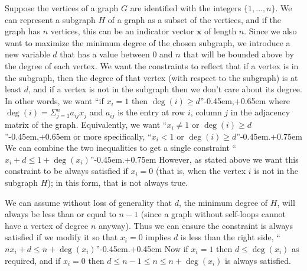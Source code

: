 Suppose the vertices of a graph $G$ are identified with the integers $\{1, \dotsc, n\}$.
We can represent a subgraph $H$ of a graph as a subset of the vertices, and if the graph has $n$ vertices, this can be an indicator vector $\mathbf{x}$ of length $n$.
Since we also want to maximize the minimum degree of the chosen subgraph, we introduce a new variable $d$ that has a value between $0$ and $n$ that will be bounded above by the degree of each vertex.
We want the constraints to reflect that if a vertex is in the subgraph, then the degree of that vertex (with respect to the subgraph) is at least $d$, and if a vertex is not in the subgraph then we don't care about its degree.
In other words, we want ``if $x_i = 1$ then $\deg(i) \geq d$''\kern-0.45em,\kern+0.65em where $\deg(i) = \Sigma_{j = 1}^n a_{ij} x_j$ and $a_{ij}$ is the entry at row $i$, column $j$ in the adjacency matrix of the graph.
Equivalently, we want ``$x_i \neq 1$ or $\deg(i) \geq d$''\kern-0.45em,\kern+0.65em or more specifically, ``$x_i < 1$ or $\deg(i) \geq d$''\kern-0.45em.\kern+0.75em
We can combine the two inequalities to get a single constraint ``$x_i + d \leq 1 + \deg(x_i)$''\kern-0.45em.\kern+0.75em
However, as stated above we want this constraint to be always satisfied if $x_i = 0$ (that is, when the vertex $i$ is not in the subgraph $H$); in this form, that is not always true.

We can assume without loss of generality that $d$, the minimum degree of $H$, will always be less than or equal to $n - 1$ (since a graph without self-loops cannot have a vertex of degree $n$ anyway).
Thus we can ensure the constraint is always satisfied if we modify it so that $x_i = 0$ implies $d$ is less than the right side, ``$n x_i + d \leq n + \deg(x_i)$''\kern-0.45em.\kern+0.45em
Now if $x_i = 1$ then $d \leq \deg(x_i)$ as required, and if $x_i = 0$ then $d \leq n- 1 \leq n \leq n + \deg(x_i)$ is always satisfied.

